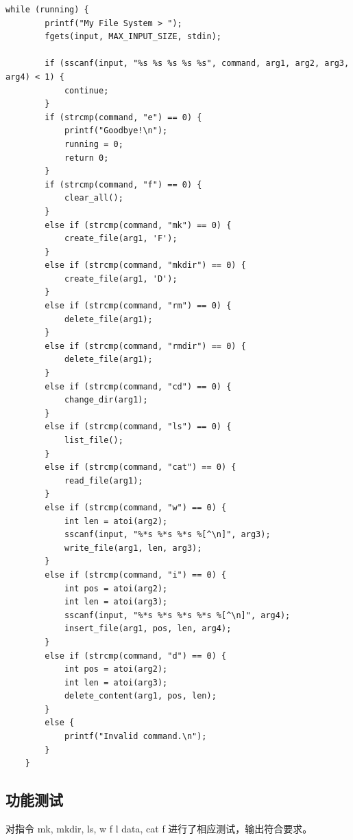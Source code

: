 \documentclass{article}
\begin{document}
\begin{lstlisting}
while (running) {
        printf("My File System > ");
        fgets(input, MAX_INPUT_SIZE, stdin);

        if (sscanf(input, "%s %s %s %s %s", command, arg1, arg2, arg3, arg4) < 1) {
            continue;
        }
        if (strcmp(command, "e") == 0) {
            printf("Goodbye!\n");
            running = 0;
            return 0;
        } 
        if (strcmp(command, "f") == 0) {
            clear_all();
        } 
        else if (strcmp(command, "mk") == 0) {
            create_file(arg1, 'F');
        } 
        else if (strcmp(command, "mkdir") == 0) {
            create_file(arg1, 'D');
        } 
        else if (strcmp(command, "rm") == 0) {
            delete_file(arg1);
        } 
        else if (strcmp(command, "rmdir") == 0) {
            delete_file(arg1);
        } 
        else if (strcmp(command, "cd") == 0) {
            change_dir(arg1);
        }
        else if (strcmp(command, "ls") == 0) {
            list_file();
        }
        else if (strcmp(command, "cat") == 0) {
            read_file(arg1);
        }
        else if (strcmp(command, "w") == 0) {
            int len = atoi(arg2);
            sscanf(input, "%*s %*s %*s %[^\n]", arg3);
            write_file(arg1, len, arg3);
        }
        else if (strcmp(command, "i") == 0) {
            int pos = atoi(arg2);
            int len = atoi(arg3);
            sscanf(input, "%*s %*s %*s %*s %[^\n]", arg4);
            insert_file(arg1, pos, len, arg4);
        }
        else if (strcmp(command, "d") == 0) {
            int pos = atoi(arg2);
            int len = atoi(arg3);
            delete_content(arg1, pos, len);
        } 
        else {
            printf("Invalid command.\n");
        }
    }
\end{lstlisting}

\subsection{功能测试}

对指令 mk, mkdir, ls, w f l data, cat f 进行了相应测试，输出符合要求。
\end{document}
